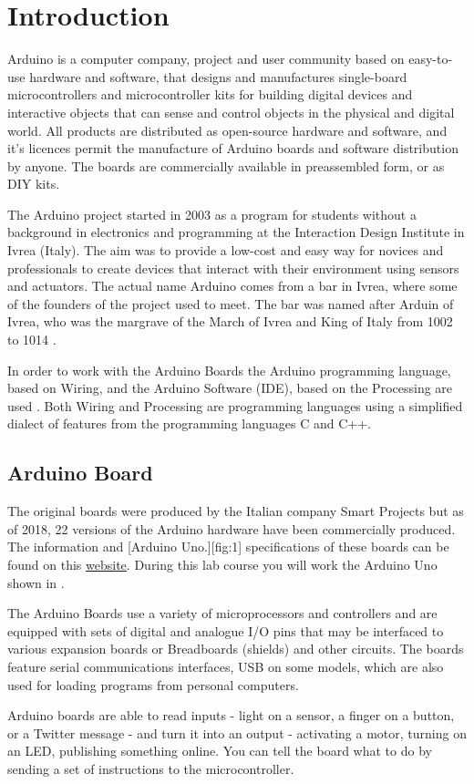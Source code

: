 \section{Introduction}
Arduino is a computer company, project and user community based on easy-to-use hardware and software, that designs and manufactures single-board microcontrollers and microcontroller kits for building digital devices and interactive objects that can sense and control objects in the physical and digital world. All products are distributed as open-source hardware and software, and it's licences permit the manufacture of Arduino boards and software distribution by anyone. The boards are commercially available in preassembled form, or as \ac{DIY} kits.\par
%
The Arduino project started in 2003 as a program for students without a background in electronics and programming at the Interaction Design Institute in Ivrea (Italy). The aim was to provide a low-cost and easy way for novices and professionals to create devices that interact with their environment using sensors and actuators. The actual name Arduino comes from a bar in Ivrea, where some of the founders of the project used to meet. The bar was named after Arduin of Ivrea, who was the margrave of the March of Ivrea and King of Italy from 1002 to 1014 \cite{wiki:1}. \par
%
In order to work with the Arduino Boards the Arduino programming language, based on Wiring, and the Arduino Software (\ac{IDE}), based on the Processing are used \cite{arduino:1}. Both Wiring and Processing are programming languages using a simplified dialect of features from the programming languages C and C++.
%
\subsection{Arduino Board}
The original boards were produced by the Italian company Smart Projects but as of 2018, 22 versions of the Arduino hardware have been commercially produced. The information and 
[Arduino Uno.][fig:1]
specifications of these boards can be found on this {\href{https://www.arduino.cc/en/Products/Compare}{website}}. During this lab course you will work the Arduino Uno shown in . \par 
%
The Arduino Boards use a variety of microprocessors and controllers and are equipped with sets of digital and analogue \ac{I/O} pins that may be interfaced to various expansion boards or Breadboards (shields) and other circuits. The boards feature serial communications interfaces, \ac{USB} on some models, which are also used for loading programs from personal computers.\par
%
Arduino boards are able to read inputs - light on a sensor, a finger on a button, or a Twitter message - and turn it into an output - activating a motor, turning on an LED, publishing something online. You can tell the board what to do by sending a set of instructions to the microcontroller.
%
